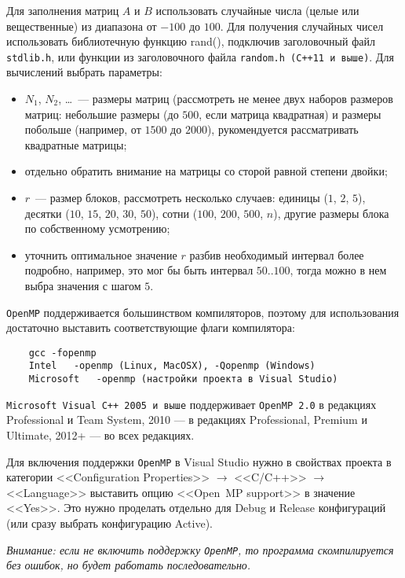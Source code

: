 Для заполнения матриц $A$ и $B$ использовать случайные числа (целые или вещественные) из диапазона от $-100$ до $100$.
Для получения случайных чисел использовать библиотечную функцию rand(), подключив заголовочный файл \texttt{stdlib.h}, или функции из заголовочного файла \texttt{random.h (С++11 и выше)}.
Для вычислений выбрать параметры:
\begin{itemize}
    \item $N_1$, $N_2$, \ldots~--- размеры матриц (рассмотреть не менее двух наборов размеров матриц: небольшие размеры (до $500$, если матрица квадратная) и размеры побольше (например, от $1500$ до $2000$),  рукомендуется рассматривать квадратные матрицы;
    \item отдельно обратить внимание на матрицы со сторой равной степени двойки;
    \item $r$~--- размер блоков, рассмотреть несколько случаев: единицы ($1$, $2$, $5$), десятки ($10$, $15$, $20$, $30$, $50$), сотни ($100$, $200$, $500$, $n$), другие размеры блока по собственному усмотрению;
    \item уточнить оптимальное значение $r$ разбив необходимый интервал более подробно, например, это мог бы быть интервал $50$..$100$, тогда можно в нем выбра значения с шагом $5$.
\end{itemize}

\texttt{OpenMP} поддерживается большинством компиляторов, поэтому для использования достаточно выставить соответствующие флаги компилятора:
\begin{verbatim}
    gcc -fopenmp
    Intel   -openmp (Linux, MacOSX), -Qopenmp (Windows)
    Microsoft   -openmp (настройки проекта в Visual Studio)
\end{verbatim}

\texttt{Microsoft Visual C++ 2005 и выше} поддерживает \texttt{OpenMP 2.0} в редакциях Professional и Team System, 2010 — в редакциях Professional, Premium и Ultimate, 2012+ — во всех редакциях.

Для включения поддержки \texttt{OpenMP} в Visual Studio нужно в свойствах проекта в категории <<Configuration Properties>> $\longrightarrow$ <<C/C++>> $\longrightarrow$ <<Language>> выставить опцию <<Open~MP support>> в значение <<Yes>>.
Это нужно проделать отдельно для Debug и Release конфигураций (или сразу выбрать конфигурацию Active).

\textit{Внимание: если не включить поддержку \texttt{OpenMP}, то программа скомпилируется без ошибок, но будет работать последовательно.}


